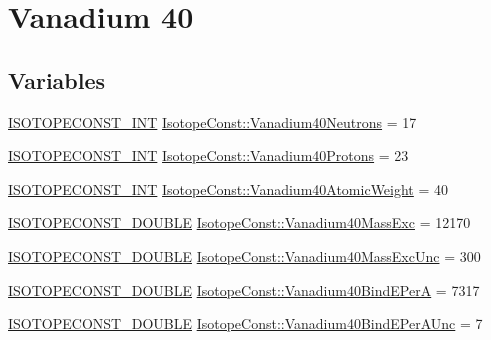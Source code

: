 \hypertarget{group___isotope_const-_vanadium-_v40}{}\section{Vanadium 40}
\label{group___isotope_const-_vanadium-_v40}
\subsection*{Variables}
\begin{DoxyCompactItemize}
\item 
\mbox{\hyperlink{group___isotope_const-_macros_ga5f18360b3e99483a35c32d789e62621c}{I\+S\+O\+T\+O\+P\+E\+C\+O\+N\+S\+T\+\_\+\+I\+NT}} \mbox{\hyperlink{group___isotope_const-_vanadium-_v40_ga2eafe46891b70e0ddfa7b818dc9ec72c}{Isotope\+Const\+::\+Vanadium40\+Neutrons}} = 17
\item 
\mbox{\hyperlink{group___isotope_const-_macros_ga5f18360b3e99483a35c32d789e62621c}{I\+S\+O\+T\+O\+P\+E\+C\+O\+N\+S\+T\+\_\+\+I\+NT}} \mbox{\hyperlink{group___isotope_const-_vanadium-_v40_gaf48e55d973210659cf3232bd7055bb26}{Isotope\+Const\+::\+Vanadium40\+Protons}} = 23
\item 
\mbox{\hyperlink{group___isotope_const-_macros_ga5f18360b3e99483a35c32d789e62621c}{I\+S\+O\+T\+O\+P\+E\+C\+O\+N\+S\+T\+\_\+\+I\+NT}} \mbox{\hyperlink{group___isotope_const-_vanadium-_v40_gab27114646169616810f8d51eaf680707}{Isotope\+Const\+::\+Vanadium40\+Atomic\+Weight}} = 40
\item 
\mbox{\hyperlink{group___isotope_const-_macros_ga8f45a7272ce02c0b4c65c44636ed719a}{I\+S\+O\+T\+O\+P\+E\+C\+O\+N\+S\+T\+\_\+\+D\+O\+U\+B\+LE}} \mbox{\hyperlink{group___isotope_const-_vanadium-_v40_ga3da72ff458878a02e9288687000bdbad}{Isotope\+Const\+::\+Vanadium40\+Mass\+Exc}} = 12170
\item 
\mbox{\hyperlink{group___isotope_const-_macros_ga8f45a7272ce02c0b4c65c44636ed719a}{I\+S\+O\+T\+O\+P\+E\+C\+O\+N\+S\+T\+\_\+\+D\+O\+U\+B\+LE}} \mbox{\hyperlink{group___isotope_const-_vanadium-_v40_gae632db0feb9fa38e76db721e1686dac0}{Isotope\+Const\+::\+Vanadium40\+Mass\+Exc\+Unc}} = 300
\item 
\mbox{\hyperlink{group___isotope_const-_macros_ga8f45a7272ce02c0b4c65c44636ed719a}{I\+S\+O\+T\+O\+P\+E\+C\+O\+N\+S\+T\+\_\+\+D\+O\+U\+B\+LE}} \mbox{\hyperlink{group___isotope_const-_vanadium-_v40_gaee8f7e990aeef1ea2ee6d7dca7ab5cdf}{Isotope\+Const\+::\+Vanadium40\+Bind\+E\+PerA}} = 7317
\item 
\mbox{\hyperlink{group___isotope_const-_macros_ga8f45a7272ce02c0b4c65c44636ed719a}{I\+S\+O\+T\+O\+P\+E\+C\+O\+N\+S\+T\+\_\+\+D\+O\+U\+B\+LE}} \mbox{\hyperlink{group___isotope_const-_vanadium-_v40_gaec47fb5f6db62a4d7917cf1b71f8e04e}{Isotope\+Const\+::\+Vanadium40\+Bind\+E\+Per\+A\+Unc}} = 7

\end{DoxyCompactItemize}
